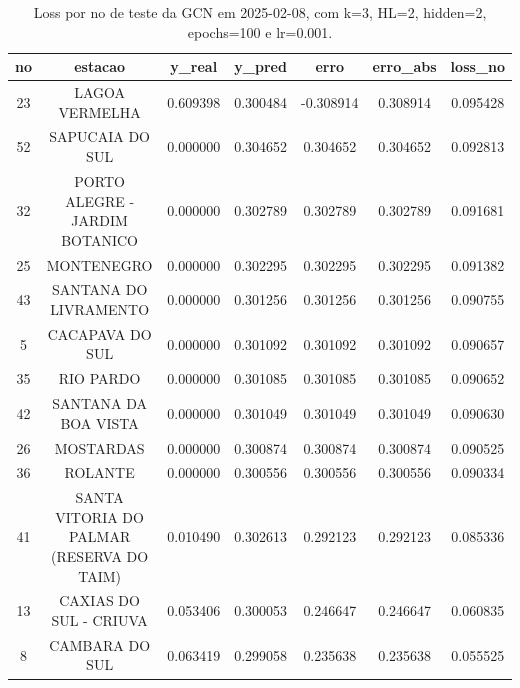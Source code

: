 \begin{table}[h]
\centering
\caption{Loss por no de teste da GCN em 2025-02-08, com k=3, HL=2, hidden=2, epochs=100 e lr=0.001.}
\label{tab:gcn_loss_k3_hl2_h2_e100_d20250208}
\begin{tabular}{ccccccc}
\toprule
no & estacao & y\_real & y\_pred & erro & erro\_abs & loss\_no \\
\midrule
23 & LAGOA VERMELHA & 0.609398 & 0.300484 & -0.308914 & 0.308914 & 0.095428 \\
52 & SAPUCAIA DO SUL & 0.000000 & 0.304652 & 0.304652 & 0.304652 & 0.092813 \\
32 & PORTO ALEGRE - JARDIM BOTANICO & 0.000000 & 0.302789 & 0.302789 & 0.302789 & 0.091681 \\
25 & MONTENEGRO & 0.000000 & 0.302295 & 0.302295 & 0.302295 & 0.091382 \\
43 & SANTANA DO LIVRAMENTO & 0.000000 & 0.301256 & 0.301256 & 0.301256 & 0.090755 \\
5 & CACAPAVA DO SUL & 0.000000 & 0.301092 & 0.301092 & 0.301092 & 0.090657 \\
35 & RIO PARDO & 0.000000 & 0.301085 & 0.301085 & 0.301085 & 0.090652 \\
42 & SANTANA DA BOA VISTA & 0.000000 & 0.301049 & 0.301049 & 0.301049 & 0.090630 \\
26 & MOSTARDAS & 0.000000 & 0.300874 & 0.300874 & 0.300874 & 0.090525 \\
36 & ROLANTE & 0.000000 & 0.300556 & 0.300556 & 0.300556 & 0.090334 \\
41 & SANTA VITORIA DO PALMAR (RESERVA DO TAIM) & 0.010490 & 0.302613 & 0.292123 & 0.292123 & 0.085336 \\
13 & CAXIAS DO SUL - CRIUVA & 0.053406 & 0.300053 & 0.246647 & 0.246647 & 0.060835 \\
8 & CAMBARA DO SUL & 0.063419 & 0.299058 & 0.235638 & 0.235638 & 0.055525 \\
\bottomrule
\end{tabular}
\end{table}
